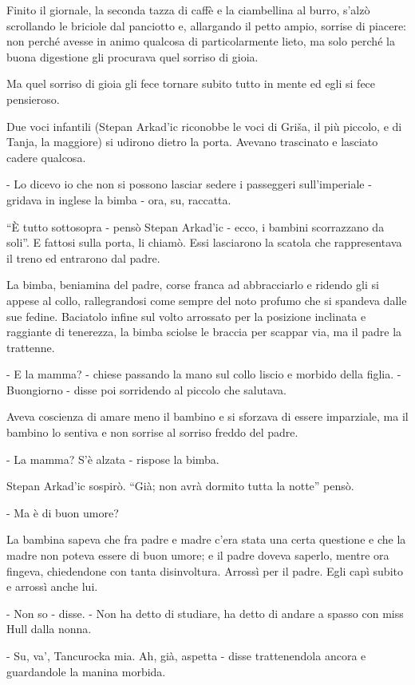 Finito il giornale, la seconda tazza di caffè e la ciambellina al burro, s'alzò scrollando le briciole dal panciotto e, allargando il petto ampio, sorrise di piacere: non perché avesse in animo qualcosa di particolarmente lieto, ma solo perché la buona digestione gli procurava quel sorriso di gioia. 

Ma quel sorriso di gioia gli fece tornare subito tutto in mente ed egli si fece pensieroso. 

Due voci infantili (Stepan Arkad'ic riconobbe le voci di Griša, il più piccolo, e di Tanja, la maggiore) si udirono dietro la porta. Avevano trascinato e lasciato cadere qualcosa. 

- Lo dicevo io che non si possono lasciar sedere i passeggeri sull'imperiale - gridava in inglese la bimba - ora, su, raccatta. 

``È tutto sottosopra - pensò Stepan Arkad'ic - ecco, i bambini scorrazzano da soli''. E fattosi sulla porta, li chiamò. Essi lasciarono la scatola che rappresentava il treno ed entrarono dal padre. 

La bimba, beniamina del padre, corse franca ad abbracciarlo e ridendo gli si appese al collo, rallegrandosi come sempre del noto profumo che si spandeva dalle sue fedine. Baciatolo infine sul volto arrossato per la posizione inclinata e raggiante di tenerezza, la bimba sciolse le braccia per scappar via, ma il padre la trattenne. 

- E la mamma? - chiese passando la mano sul collo liscio e morbido della figlia. - Buongiorno - disse poi sorridendo al piccolo che salutava. 

Aveva coscienza di amare meno il bambino e si sforzava di essere imparziale, ma il bambino lo sentiva e non sorrise al sorriso freddo del padre. 

- La mamma? S'è alzata - rispose la bimba. 

Stepan Arkad'ic sospirò. ``Già; non avrà dormito tutta la notte'' pensò. 

- Ma è di buon umore? 

La bambina sapeva che fra padre e madre c'era stata una certa questione e che la madre non poteva essere di buon umore; e il padre doveva saperlo, mentre ora fingeva, chiedendone con tanta disinvoltura. Arrossì per il padre. Egli capì subito e arrossì anche lui. 

- Non so - disse. - Non ha detto di studiare, ha detto di andare a spasso con miss Hull dalla nonna. 

- Su, va', Tancurocka mia. Ah, già, aspetta - disse trattenendola ancora e guardandole la manina morbida. 

